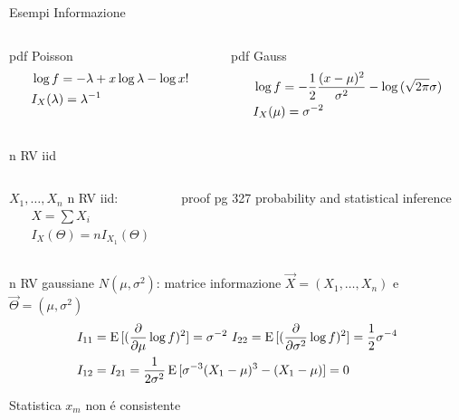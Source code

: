 \begin{wordonframe}{Esempi Informazione}
\begin{columns}[T]
\begin{column}{0.5\textwidth}
	\begin{block}{pdf Poisson}
		\begin{align*}
		&\log{f}=-\lambda+x\log{\lambda}-\log{x!}\\
		&I_X(\lambda)={\lambda}^{-1}
		\end{align*}
	\end{block}
\end{column}
\begin{column}{0.5\textwidth}
	\begin{block}{pdf Gauss}
		\begin{align*}
		&\log{f}=-\frac{1}{2}\frac{(x-\mu)^2}{\sigma^2}-\log{(\sqrt{2\pi}\sigma)}\\
		&I_X(\mu)=\sigma^{-2}
		\end{align*}
	\end{block}
\end{column}
\end{columns}
\begin{block}{n RV iid}
\begin{columns}[T]
	\begin{column}{0.5\textwidth}
		$X_1,\ldots,X_n$ n RV iid:
		\begin{align*}
		&X=\sum X_i\\
		&I_X(\Theta)=nI_{X_1}(\Theta)
		\end{align*}
	\end{column}
	\begin{column}{0.5\textwidth}
		proof pg 327 probability and statistical inference
	\end{column}
\end{columns}
\end{block}
\begin{block}{n RV gaussiane $N(\mu,\sigma^2)$: matrice informazione}
$\vec{X}=(X_1,\ldots,X_n)$ e $\vec{\Theta}=(\mu,\sigma^2)$
\begin{align*}
&I_{11}=\E{[(\PDof{\mu}\log{f})^2]}=\sigma\expy{-2}\ I_{22}=\E{[(\PDof{\sigma^2}\log{f})^2]}=\frac{1}{2}\sigma\expy{-4}\\
&I_{12}=I_{21}=\frac{1}{2\sigma^2}\E{[\sigma\expy{-3}(X_1-\mu)^3-(X_1-\mu)]}=0
\end{align*}
\end{block}
\begin{block}{Statistica $x_m$ non \'e consistente}
\begin{align*}

\end{align*}
\end{block}
\end{wordonframe}
